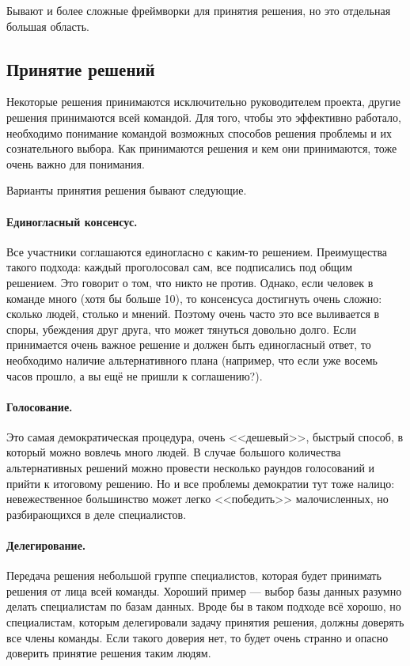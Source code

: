 \documentclass{../../text-style}
\begin{document}
Бывают и более сложные фреймворки для принятия решения, но это отдельная большая область.

\subsection{Принятие решений}

Некоторые решения принимаются исключительно руководителем проекта, другие решения принимаются всей командой. Для того, чтобы это эффективно работало, необходимо понимание командой возможных способов решения проблемы и их сознательного выбора. Как принимаются решения и кем они принимаются, тоже очень важно для понимания.

Варианты принятия решения бывают следующие.

\paragraph*{Единогласный консенсус.} Все участники соглашаются единогласно с каким-то решением. Преимущества такого подхода: каждый проголосовал сам, все подписались под общим решением. Это говорит о том, что никто не против. Однако, если человек в команде много (хотя бы больше 10), то консенсуса достигнуть очень сложно: сколько людей, столько и мнений. Поэтому очень часто это все выливается в споры, убеждения друг друга, что может тянуться довольно долго. Если принимается очень важное решение и должен быть единогласный ответ, то необходимо наличие альтернативного плана (например, что если уже восемь часов прошло, а вы ещё не пришли к соглашению?).

\paragraph*{Голосование.} Это самая демократическая процедура, очень <<дешевый>>, быстрый способ, в который можно вовлечь много людей. В случае большого количества альтернативных решений можно провести несколько раундов голосований и прийти к итоговому решению. Но и все проблемы демократии тут тоже налицо: невежественное большинство может легко <<победить>> малочисленных, но разбирающихся в деле специалистов.

\paragraph*{Делегирование.} Передача решения небольшой группе специалистов, которая будет принимать решения от лица всей команды. Хороший пример --- выбор базы данных разумно делать специалистам по базам данных. Вроде бы в таком подходе всё хорошо, но специалистам, которым делегировали задачу принятия решения, должны доверять все члены команды. Если такого доверия нет, то будет очень странно и опасно доверить принятие решения таким людям.
\end{document}
